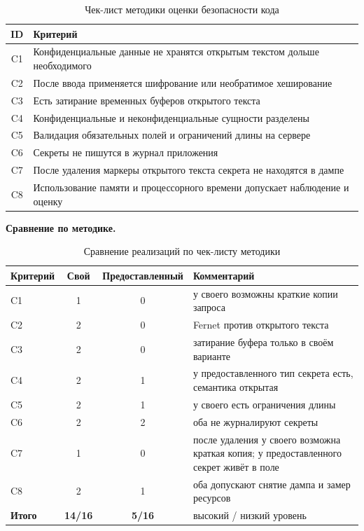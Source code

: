 \begin{table}[ht]
	\begin{tabularx}{\textwidth}{|c|X|}
		\hline
		\textbf{ID} & \textbf{Критерий} \\
		\hline
		C1 & Конфиденциальные данные не хранятся открытым текстом дольше необходимого \\
		\hline
		C2 & После ввода применяется шифрование или необратимое хеширование \\
		\hline
		C3 & Есть затирание временных буферов открытого текста \\
		\hline
		C4 & Конфиденциальные и неконфиденциальные сущности разделены \\
		\hline
		C5 & Валидация обязательных полей и ограничений длины на сервере \\
		\hline
		C6 & Секреты не пишутся в журнал приложения \\
		\hline
		C7 & После удаления маркеры открытого текста секрета не находятся в дампе \\
		\hline
		C8 & Использование памяти и процессорного времени допускает наблюдение и оценку \\
		\hline
	\end{tabularx}
	\caption{Чек-лист методики оценки безопасности кода}
	\label{tab:checklist}
\end{table}

\pagebreak
\textbf{Сравнение по методике.}

\begin{table}[ht]
	\begin{tabularx}{\textwidth}{|l|c|c|X|}
		\hline
		\textbf{Критерий} & \textbf{Свой} & \textbf{Предоставленный} & \textbf{Комментарий} \\
		\hline
		C1 & 1 & 0 & у своего возможны краткие копии запроса \\
		\hline
		C2 & 2 & 0 & Fernet против открытого текста \\
		\hline
		C3 & 2 & 0 & затирание буфера только в своём варианте \\
		\hline
		C4 & 2 & 1 & у предоставленного тип секрета есть, семантика открытая \\
		\hline
		C5 & 2 & 1 & у своего есть ограничения длины \\
		\hline
		C6 & 2 & 2 & оба не журналируют секреты \\
		\hline
		C7 & 1 & 0 & после удаления у своего возможна краткая копия; у предоставленного секрет живёт в поле \\
		\hline
		C8 & 2 & 1 & оба допускают снятие дампа и замер ресурсов \\
		\hline
		\textbf{Итого} & \textbf{14/16} & \textbf{5/16} & высокий / низкий уровень \\
		\hline
	\end{tabularx}
	\caption{Сравнение реализаций по чек-листу методики}
	\label{tab:cmp}
\end{table}

